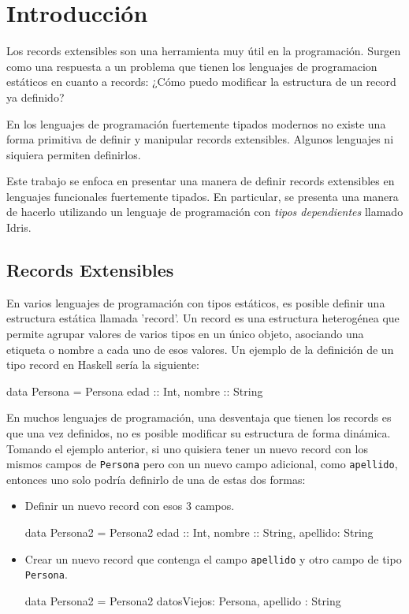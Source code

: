 
\chapter{Introducción}
\label{ch:1}

Los records extensibles son una herramienta muy útil en la programación. Surgen como una respuesta a un problema que tienen los lenguajes de programacion estáticos en cuanto a records: ¿Cómo puedo modificar la estructura de un record ya definido?

En los lenguajes de programación fuertemente tipados modernos no existe una forma primitiva de definir y manipular records extensibles. Algunos lenguajes ni siquiera permiten definirlos.

Este trabajo se enfoca en presentar una manera de definir records extensibles en lenguajes funcionales fuertemente tipados. En particular, se presenta una manera de hacerlo utilizando un lenguaje de programación con \textit{tipos dependientes} llamado Idris.

\section{Records Extensibles}

En varios lenguajes de programación con tipos estáticos, es posible definir una estructura estática llamada 'record'. Un record es una estructura heterogénea que permite agrupar valores de varios tipos en un único objeto, asociando una etiqueta o nombre a cada uno de esos valores.
Un ejemplo de la definición de un tipo record en Haskell sería la siguiente:

\begin{code}
data Persona = Persona { edad :: Int, nombre :: String}
\end{code}

En muchos lenguajes de programación, una desventaja que tienen los records es que una vez definidos, no es posible modificar su estructura de forma dinámica. Tomando el ejemplo anterior, si uno quisiera tener un nuevo record con los mismos campos de \texttt{Persona} pero con un nuevo campo adicional, como \texttt{apellido}, entonces uno solo podría definirlo de una de estas dos formas:
\begin{itemize}[noitemsep]
\item Definir un nuevo record con esos 3 campos.
\begin{code}
data Persona2 = Persona2 { 
  edad :: Int, 
  nombre :: String, 
  apellido: String
}
\end{code}
\item Crear un nuevo record que contenga el campo \texttt{apellido} y otro campo de tipo \texttt{Persona}.
\begin{code}
data Persona2 = Persona2 { 
  datosViejos: Persona, 
  apellido : String
}
\end{code}
\end{itemize}

